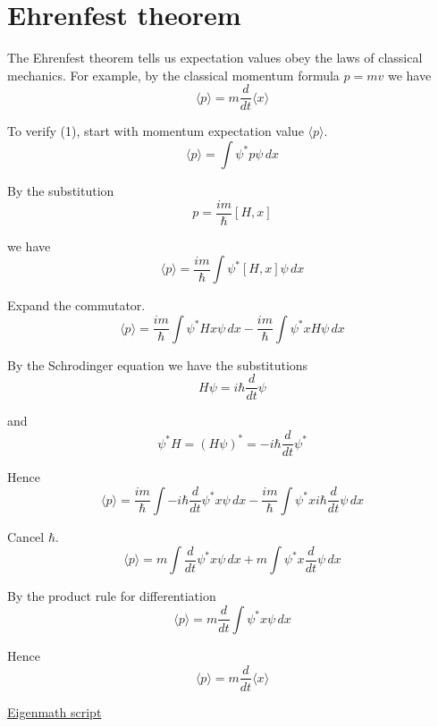 

\section*{Ehrenfest theorem}

The Ehrenfest theorem tells us expectation values obey the laws of classical mechanics.
For example, by the classical momentum formula $p=mv$ we have
\begin{equation*}
\langle p\rangle=m\frac{d}{dt}\langle x\rangle
\tag{1}
\end{equation*}

To verify (1), start with momentum expectation value $\langle p\rangle$.
\begin{equation*}
\langle p\rangle=\int\psi^*p\psi\,dx
\end{equation*}

By the substitution
\begin{equation*}
p=\frac{im}{\hbar}[H,x]
\end{equation*}

we have
\begin{equation*}
\langle p\rangle=\frac{im}{\hbar}\int\psi^*[H,x]\psi\,dx
\end{equation*}

Expand the commutator.
\begin{equation*}
\langle p\rangle=\frac{im}{\hbar}\int\psi^*Hx\psi\,dx-\frac{im}{\hbar}\int\psi^*xH\psi\,dx
\end{equation*}

By the Schrodinger equation we have the substitutions
\begin{equation*}
H\psi=i\hbar\frac{d}{dt}\psi
\end{equation*}

and
\begin{equation*}
\psi^*H=(H\psi)^*=-i\hbar\frac{d}{dt}\psi^*
\end{equation*}

Hence
\begin{equation*}
\langle p\rangle=\frac{im}{\hbar}\int-i\hbar\frac{d}{dt}\psi^*x\psi\,dx
-\frac{im}{\hbar}\int\psi^*xi\hbar\frac{d}{dt}\psi\,dx
\end{equation*}

Cancel $\hbar$.
\begin{equation*}
\langle p\rangle=m\int\frac{d}{dt}\psi^*x\psi\,dx+m\int\psi^*x\frac{d}{dt}\psi\,dx
\end{equation*}

By the product rule for differentiation
\begin{equation*}
\langle p\rangle=m\frac{d}{dt}\int\psi^*x\psi\,dx
\end{equation*}

Hence
\begin{equation*}
\langle p\rangle=m\frac{d}{dt}\langle x\rangle
\end{equation*}

\href{https://georgeweigt.github.io/examples/ehrenfest-theorem-demo.html}{Eigenmath script}


